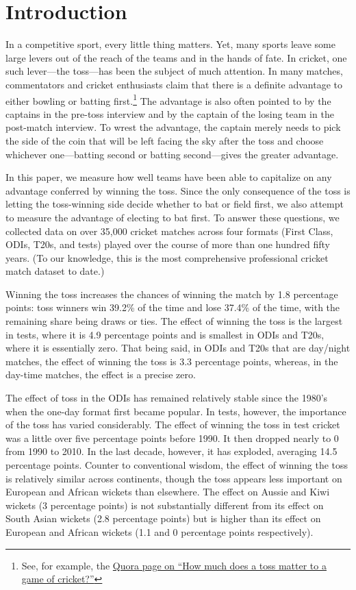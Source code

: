 \documentclass[11pt,  letterpaper]{article}
\begin{document}
\section{Introduction}
In a competitive sport, every little thing matters. Yet, many sports leave some large levers out of the reach of the teams and in the
hands of fate. In cricket, one such lever---the toss---has been the subject of much attention. In many matches, commentators and cricket enthusiasts claim that there is a definite advantage to either bowling or batting first.\footnote{See, for example, the \href{https://www.quora.com/How-much-does-a-toss-matter-to-a-game-of-cricket}{Quora page on ``How much does a toss matter to a game of cricket?''}} The advantage is also often pointed to by the captains in the pre-toss interview and by the captain of the losing team in the post-match interview. To wrest the advantage, the captain merely needs to pick the side of the coin that will be left facing the sky after the toss and choose whichever one---batting second or batting second---gives the greater advantage.

In this paper, we measure how well teams have been able to capitalize on any advantage conferred by winning the toss. Since the only consequence of the toss is letting the toss-winning side decide whether to bat or field first, we also attempt to measure the advantage of electing to bat first. To answer these questions, we collected data on over 35,000 cricket matches across four formats (First Class, ODIs, T20s, and tests) played over the course of more than one hundred fifty years. (To our knowledge, this is the most comprehensive professional cricket match dataset to date.)

Winning the toss increases the chances of winning the match by 1.8 percentage points: toss winners win 39.2\% of the time and lose 37.4\% of the time, with the remaining share being draws or ties. The effect of winning the toss is the largest in tests, where it is 4.9 percentage points and is smallest in ODIs and T20s, where it is essentially zero. That being said, in ODIs and T20s that are day/night matches, the effect of winning the toss is 3.3 percentage points, whereas, in the day-time matches, the effect is a precise zero.

The effect of toss in the ODIs has remained relatively stable since the 1980's when the one-day format first became popular. In tests, however, the importance of the toss has varied considerably. The effect of winning the toss in test cricket was a little over five percentage points before 1990. It then dropped nearly to 0 from 1990 to 2010. In the last decade, however, it has exploded, averaging 14.5 percentage points. Counter to conventional wisdom, the effect of winning the toss is relatively similar across continents, though the toss appears less important on European and African wickets than elsewhere. The effect on Aussie and Kiwi wickets (3 percentage points) is not substantially different from its effect on South Asian wickets (2.8 percentage points) but is higher than its effect on European and African wickets (1.1 and 0 percentage points respectively).
\end{document}
